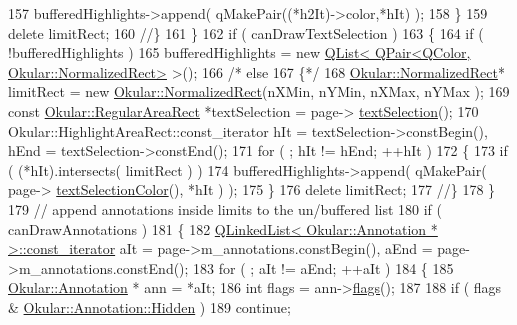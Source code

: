 \begin{DoxyCode}
157                             bufferedHighlights->append( qMakePair((*h2It)->color,*hIt) );
158                     \}
159                 \textcolor{keyword}{delete} limitRect;
160             \textcolor{comment}{//\}}
161         \}
162         \textcolor{keywordflow}{if} ( canDrawTextSelection )
163         \{
164             \textcolor{keywordflow}{if} ( !bufferedHighlights )
165                  bufferedHighlights = \textcolor{keyword}{new} 
      \hyperlink{classQList}{QList< QPair<QColor, Okular::NormalizedRect>}  >();
166 \textcolor{comment}{/*            else}
167 \textcolor{comment}{            \{*/}
168                 \hyperlink{classOkular_1_1NormalizedRect}{Okular::NormalizedRect}* limitRect = \textcolor{keyword}{new} 
      \hyperlink{classOkular_1_1NormalizedRect}{Okular::NormalizedRect}(nXMin, nYMin, nXMax, nYMax );
169                 \textcolor{keyword}{const} \hyperlink{classOkular_1_1RegularAreaRect}{Okular::RegularAreaRect} *textSelection = page->
      \hyperlink{classOkular_1_1Page_a8b357ca7010d815f378094a7ba279a33}{textSelection}();
170                 Okular::HighlightAreaRect::const\_iterator hIt = textSelection->constBegin(), hEnd = 
      textSelection->constEnd();
171                 \textcolor{keywordflow}{for} ( ; hIt != hEnd; ++hIt )
172                 \{
173                     \textcolor{keywordflow}{if} ( (*hIt).intersects( limitRect ) )
174                         bufferedHighlights->append( qMakePair( page->
      \hyperlink{classOkular_1_1Page_a976e5f9876ca12676203fce0a6323cc8}{textSelectionColor}(), *hIt ) );
175                 \}
176                 \textcolor{keyword}{delete} limitRect;
177             \textcolor{comment}{//\}}
178         \}
179         \textcolor{comment}{// append annotations inside limits to the un/buffered list}
180         \textcolor{keywordflow}{if} ( canDrawAnnotations )
181         \{
182             \hyperlink{classQLinkedList}{QLinkedList< Okular::Annotation * >::const\_iterator}
       aIt = page->m\_annotations.constBegin(), aEnd = page->m\_annotations.constEnd();
183             \textcolor{keywordflow}{for} ( ; aIt != aEnd; ++aIt )
184             \{
185                 \hyperlink{classOkular_1_1Annotation}{Okular::Annotation} * ann = *aIt;
186                 \textcolor{keywordtype}{int} flags = ann->\hyperlink{classOkular_1_1Annotation_a3d6f7ee5057155b90e76c24768880947}{flags}();
187 
188                 \textcolor{keywordflow}{if} ( flags & \hyperlink{classOkular_1_1Annotation_a8a214541446745761efeda70b3a4302ea053e3857f5c7f494a996e649e5e97244}{Okular::Annotation::Hidden} )
189                     \textcolor{keywordflow}{continue};

\end{DoxyCode}
